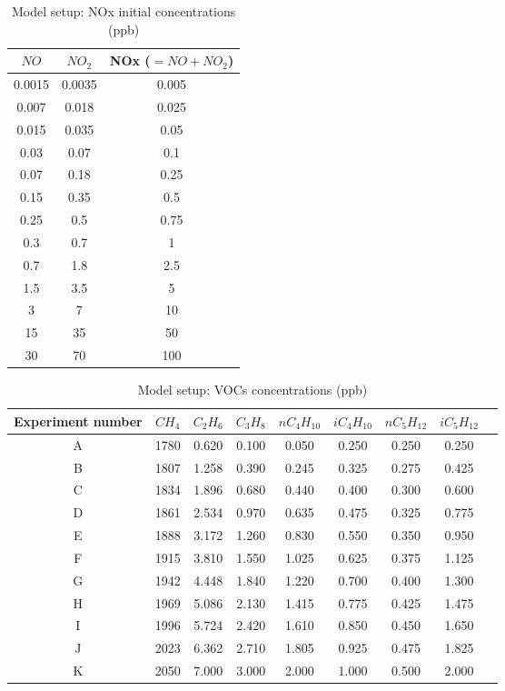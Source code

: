 \documentclass[11pt,a4paper]{article}
\begin{document}
\begin{table} %
\caption{Model setup: NOx initial concentrations (ppb)}\label{tab:setupNOx}
\centering
\begin{tabular}{ccc}
\hline
$NO$      & $NO_2$      & NOx  ($=NO+NO_2$) \\
\hline
0.0015    & 0.0035      & 0.005 \\
0.007     & 0.018       & 0.025 \\
0.015     & 0.035       & 0.05  \\
0.03      & 0.07        & 0.1   \\
0.07      & 0.18        & 0.25  \\
0.15      & 0.35        & 0.5   \\
0.25      & 0.5         & 0.75  \\
0.3       & 0.7         & 1     \\
0.7       & 1.8         & 2.5   \\
1.5       & 3.5         & 5     \\
3         & 7           & 10    \\
15        & 35          & 50    \\
30        & 70          & 100   \\
\hline
\end{tabular}
\end{table}	

\begin{table} %
\caption{Model setup: VOCs concentrations (ppb)}\label{tab:setupVOCs}
\centering
\begin{tabular}{ccccccccc}
\hline
Experiment number & $CH_4$ & $C_2H_6$ & $C_3H_8$ & $nC_4H_{10}$ & $iC_4H_{10}$ & $nC_5H_{12}$ & $iC_5H_{12}$ \\
\hline
A  & 1780 &	0.620 &	0.100 &	0.050 &	0.250 &	0.250 &	0.250 \\
B  & 1807 &	1.258 &	0.390 &	0.245 &	0.325 &	0.275 &	0.425 \\
C  & 1834 &	1.896 &	0.680 &	0.440 &	0.400 &	0.300 &	0.600 \\
D  & 1861 &	2.534 &	0.970 &	0.635 &	0.475 &	0.325 &	0.775 \\
E  & 1888 &	3.172 &	1.260 &	0.830 &	0.550 &	0.350 &	0.950 \\
F  & 1915 &	3.810 &	1.550 &	1.025 &	0.625 &	0.375 &	1.125 \\
G  & 1942 &	4.448 &	1.840 &	1.220 &	0.700 &	0.400 &	1.300 \\
H  & 1969 &	5.086 &	2.130 &	1.415 &	0.775 &	0.425 &	1.475 \\
I  & 1996 &	5.724 &	2.420 &	1.610 &	0.850 &	0.450 &	1.650 \\
J  & 2023 &	6.362 &	2.710 &	1.805 &	0.925 &	0.475 &	1.825 \\
K  & 2050 &	7.000 &	3.000 &	2.000 &	1.000 &	0.500 &	2.000 \\
\hline
\end{tabular}
\end{table}
\end{document}
